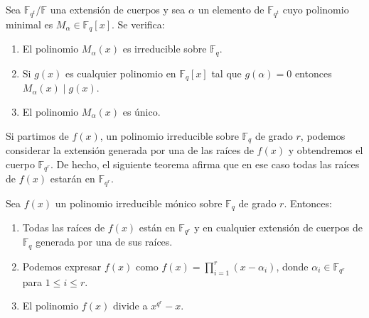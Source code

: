 \begin{theorem}
  \label{th:pol-minimal}
  Sea \(\mathbb F_{q^t}/\mathbb F\) una extensión de cuerpos y sea \(\alpha\) un elemento de \(\mathbb F_{q^t}\) cuyo polinomio minimal es \(M_{\alpha} \in \mathbb F_q[x]\).
  Se verifica:
  \begin{enumerate}
    \item El polinomio \(M_{\alpha}(x)\) es irreducible sobre \(\mathbb F_q\).
    \item Si \(g(x)\) es cualquier polinomio en \(\mathbb F_q[x]\) tal que \(g(\alpha) = 0\) entonces \(M_{\alpha}(x) \mid g(x)\).
    \label{thi:pol-minimal-div}
    \item El polinomio \(M_{\alpha}(x)\) es único.
  \end{enumerate}
\end{theorem}

Si partimos de \(f(x)\), un polinomio irreducible sobre \(\mathbb F_q\) de grado \(r\), podemos considerar la extensión generada por una de las raíces de \(f(x)\) y obtendremos el cuerpo \(\mathbb F_{q^r}\).
De hecho, el siguiente teorema afirma que en ese caso todas las raíces de \(f(x)\) estarán en \(\mathbb F_{q^r}\).

\begin{theorem}
  Sea \(f(x)\) un polinomio irreducible mónico sobre \(\mathbb F_q\) de grado \(r\).
  Entonces:
  \begin{enumerate}
    \item Todas las raíces de \(f(x)\) están en \(\mathbb F_{q^r}\) y en cualquier extensión de cuerpos de \(\mathbb F_q\) generada por una de sus raíces.
    \label{thi:pol-irr-raices}
    \item Podemos expresar \(f(x)\) como \(f(x) = \prod_{i=1}^r (x - \alpha_i)\), donde \(\alpha_i \in \mathbb F_{q^r}\) para \(1 \leq i \leq r\).
    \item El polinomio \(f(x)\) divide a \(x^{q^r} - x\).
    \label{thi:pol-irr-factor}
  \end{enumerate}
  \label{th:pol-irr}
\end{theorem}

